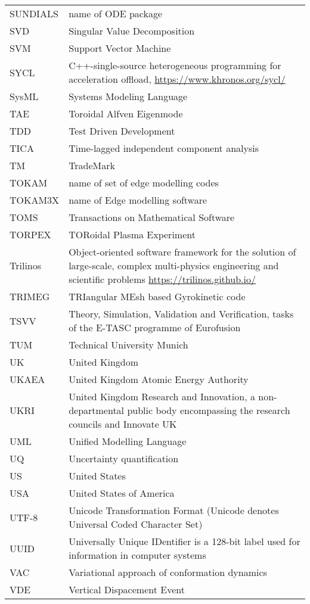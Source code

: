\begin{longtable}{|p{4.0cm}|p{12.0cm}|}
SUNDIALS & name of ODE package \\
SVD & Singular Value Decomposition \\
SVM & Support Vector Machine \\
SYCL & C++-single-source heterogeneous programming for acceleration offload, \url{https://www.khronos.org/sycl/} \\
SysML & Systems Modeling Language  \\
TAE & Toroidal Alfven Eigenmode \\
TDD & Test Driven Development \\
TICA  & Time-lagged independent component analysis \\
TM & TradeMark\\
TOKAM & name of set of edge modelling codes\\
TOKAM3X & name of Edge modelling software \\
TOMS & Transactions on Mathematical Software \\
TORPEX & TORoidal Plasma Experiment \\
Trilinos & Object-oriented software framework for the solution of large-scale, complex multi-physics engineering and scientific problems \url{https://trilinos.github.io/}\\
TRIMEG & TRIangular MEsh based Gyrokinetic code\\
TSVV & Theory, Simulation, Validation and Verification, tasks of the E-TASC programme of Eurofusion \\
TUM & Technical University Munich\\
UK & United Kingdom \\
UKAEA & United Kingdom Atomic Energy Authority \\
UKRI & United Kingdom Research and Innovation, a non-departmental public body encompassing the research councils and Innovate UK \\
UML & Unified Modelling Language\\
UQ & Uncertainty quantification \\
US & United States \\
USA & United States of America\\
UTF-8 & Unicode Transformation Format (Unicode denotes Universal Coded Character Set) \\
UUID & Universally Unique IDentifier is a 128-bit label used for information in computer systems\\
VAC  & Variational approach of conformation dynamics \\
VDE & Vertical Dispacement Event\\

\end{longtable}
